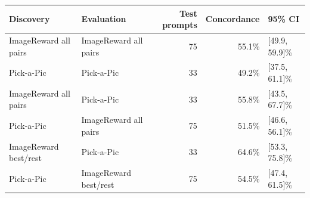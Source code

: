 \begin{tabular}{llrrl}
\toprule
Discovery & Evaluation & Test prompts & Concordance & 95\% CI \\
\midrule
ImageReward all pairs & ImageReward all pairs & 75 & 55.1\% & [49.9, 59.9]\% \\
Pick-a-Pic & Pick-a-Pic & 33 & 49.2\% & [37.5, 61.1]\% \\
ImageReward all pairs & Pick-a-Pic & 33 & 55.8\% & [43.5, 67.7]\% \\
Pick-a-Pic & ImageReward all pairs & 75 & 51.5\% & [46.6, 56.1]\% \\
ImageReward best/rest & Pick-a-Pic & 33 & 64.6\% & [53.3, 75.8]\% \\
Pick-a-Pic & ImageReward best/rest & 75 & 54.5\% & [47.4, 61.5]\% \\
\bottomrule
\end{tabular}

